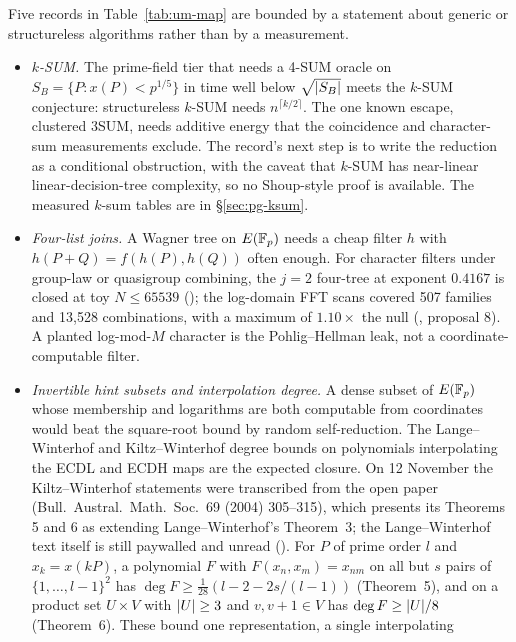 Five records in Table~\ref{tab:um-map} are bounded by a statement about
generic or structureless algorithms rather than by a measurement.
\begin{itemize}
\item \emph{$k$-SUM.} The prime-field tier that needs a 4-SUM oracle on
  $S_B=\{P:x(P)<p^{1/5}\}$ in time well below $\sqrt{\lvert S_B \rvert}$ meets the
  $k$-SUM conjecture: structureless $k$-SUM needs $n^{\lceil k/2\rceil}$. The
  one known escape, clustered 3SUM, needs additive energy that the
  coincidence and character-sum measurements exclude. The record's next step
  is to write the reduction as a conditional obstruction, with the caveat
  that $k$-SUM has near-linear linear-decision-tree complexity, so no
  Shoup-style proof is available. The measured $k$-sum tables are in
  \S\ref{sec:pg-ksum}.
\item \emph{Four-list joins.} A Wagner tree on $E(\mathbb{F}_p)$ needs a cheap
  filter $h$ with $h(P+Q)=f(h(P),h(Q))$ often enough. For character filters
  under group-law or quasigroup combining, the $j=2$ four-tree at exponent
  $0.4167$ is closed at toy $N\le65539$
  (); the
  log-domain FFT scans covered 507 families and 13{,}528 combinations, with a
  maximum of $1.10\times$ the null
  (, proposal 8). A
  planted log-mod-$M$ character is the Pohlig--Hellman leak, not a
  coordinate-computable filter.
\item \emph{Invertible hint subsets and interpolation degree.} A dense
  subset of $E(\mathbb{F}_p)$ whose membership and logarithms are both computable
  from coordinates would beat the square-root bound by random
  self-reduction. The Lange--Winterhof and Kiltz--Winterhof degree bounds on
  polynomials interpolating the ECDL and ECDH maps are the expected closure.
  On 12 November the Kiltz--Winterhof statements were transcribed from the
  open paper (Bull.\ Austral.\ Math.\ Soc.\ 69 (2004) 305--315), which
  presents its Theorems 5 and 6 as extending Lange--Winterhof's Theorem~3;
  the Lange--Winterhof text itself is still paywalled and unread
  ().
  For $P$ of prime order $l$ and $x_k=x(kP)$, a polynomial $F$ with
  $F(x_n,x_m)=x_{nm}$ on all but $s$ pairs of $\{1,\dots,l-1\}^2$ has
  $\deg F\ge\frac1{28}(l-2-2s/(l-1))$ (Theorem~5), and on a product set
  $U\times V$ with $\lvert U \rvert\ge3$ and $v,v+1\in V$ has $\deg F\ge\lvert U \rvert/8$
  (Theorem~6). These bound one representation, a single interpolating

\end{itemize}

